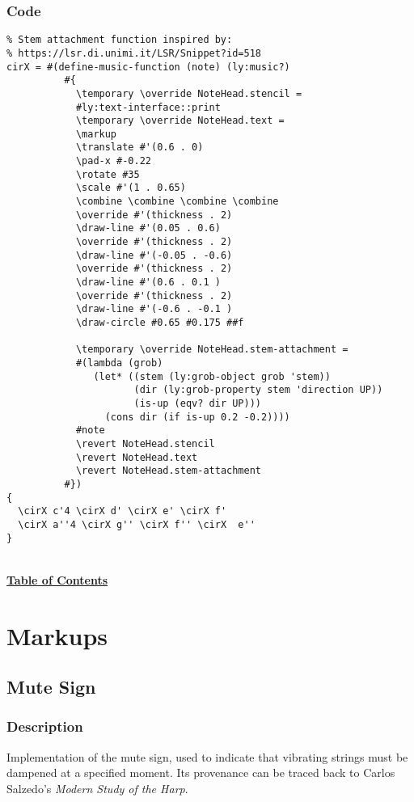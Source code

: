 \documentclass[11pt, oneside]{book}   	%
\begin{document}
\subsection{Code}
\begin{verbatim}
% Stem attachment function inspired by:
% https://lsr.di.unimi.it/LSR/Snippet?id=518
cirX = #(define-music-function (note) (ly:music?)
          #{
            \temporary \override NoteHead.stencil =
            #ly:text-interface::print
            \temporary \override NoteHead.text =
            \markup
            \translate #'(0.6 . 0)
            \pad-x #-0.22
            \rotate #35
            \scale #'(1 . 0.65)
            \combine \combine \combine \combine
            \override #'(thickness . 2)
            \draw-line #'(0.05 . 0.6)
            \override #'(thickness . 2)
            \draw-line #'(-0.05 . -0.6)
            \override #'(thickness . 2)
            \draw-line #'(0.6 . 0.1 )
            \override #'(thickness . 2)
            \draw-line #'(-0.6 . -0.1 )
            \draw-circle #0.65 #0.175 ##f

            \temporary \override NoteHead.stem-attachment =
            #(lambda (grob)
               (let* ((stem (ly:grob-object grob 'stem))
                      (dir (ly:grob-property stem 'direction UP))
                      (is-up (eqv? dir UP)))
                 (cons dir (if is-up 0.2 -0.2))))
            #note
            \revert NoteHead.stencil
            \revert NoteHead.text
            \revert NoteHead.stem-attachment
          #})
{
  \cirX c'4 \cirX d' \cirX e' \cirX f'
  \cirX a''4 \cirX g'' \cirX f'' \cirX  e''
}
\end{verbatim}
\hyperref[sec:toc]{\\ \textbf{Table of Contents}}

\vfill \break




\chapter {Markups}


\section {Mute Sign}
\hfill

\subsection{Description}
Implementation of the mute sign, used to indicate that vibrating strings must be dampened at a specified moment. Its provenance can be traced back to Carlos Salzedo's \textit{Modern Study of the Harp}.\autocite[19]{RN4} 
\end{document}
